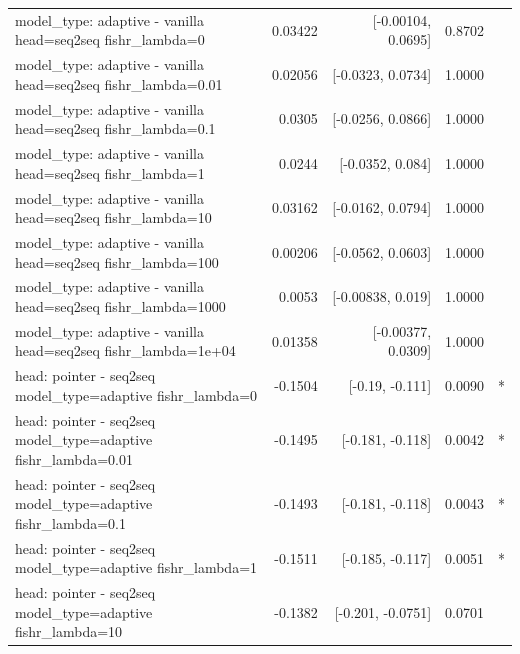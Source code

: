 \documentclass[10pt]{article}
\makeatletter
\newcommand{\stackcell}[1]{\begin{tabular}[t]{@{}l@{}}#1\end{tabular}}
\makeatother
\begin{document}
{\begin{longtable}{lrrrl}
\stackcell{model\_type: adaptive - vanilla\\\footnotesize head=seq2seq fishr\_lambda=0 } & 0.03422 & [-0.00104, 0.0695] & 0.8702 & \\
\stackcell{model\_type: adaptive - vanilla\\\footnotesize head=seq2seq fishr\_lambda=0.01 } & 0.02056 & [-0.0323, 0.0734] & 1.0000 & \\
\stackcell{model\_type: adaptive - vanilla\\\footnotesize head=seq2seq fishr\_lambda=0.1 } & 0.0305 & [-0.0256, 0.0866] & 1.0000 & \\
\stackcell{model\_type: adaptive - vanilla\\\footnotesize head=seq2seq fishr\_lambda=1 } & 0.0244 & [-0.0352, 0.084] & 1.0000 & \\
\stackcell{model\_type: adaptive - vanilla\\\footnotesize head=seq2seq fishr\_lambda=10 } & 0.03162 & [-0.0162, 0.0794] & 1.0000 & \\
\stackcell{model\_type: adaptive - vanilla\\\footnotesize head=seq2seq fishr\_lambda=100 } & 0.00206 & [-0.0562, 0.0603] & 1.0000 & \\
\stackcell{model\_type: adaptive - vanilla\\\footnotesize head=seq2seq fishr\_lambda=1000 } & 0.0053 & [-0.00838, 0.019] & 1.0000 & \\
\stackcell{model\_type: adaptive - vanilla\\\footnotesize head=seq2seq fishr\_lambda=1e+04 } & 0.01358 & [-0.00377, 0.0309] & 1.0000 & \\
\stackcell{head: pointer - seq2seq\\\footnotesize model\_type=adaptive fishr\_lambda=0 } & -0.1504 & [-0.19, -0.111] & 0.0090 & *\\
\stackcell{head: pointer - seq2seq\\\footnotesize model\_type=adaptive fishr\_lambda=0.01 } & -0.1495 & [-0.181, -0.118] & 0.0042 & *\\
\stackcell{head: pointer - seq2seq\\\footnotesize model\_type=adaptive fishr\_lambda=0.1 } & -0.1493 & [-0.181, -0.118] & 0.0043 & *\\
\stackcell{head: pointer - seq2seq\\\footnotesize model\_type=adaptive fishr\_lambda=1 } & -0.1511 & [-0.185, -0.117] & 0.0051 & *\\
\stackcell{head: pointer - seq2seq\\\footnotesize model\_type=adaptive fishr\_lambda=10 } & -0.1382 & [-0.201, -0.0751] & 0.0701 & \\

\end{longtable}}
\end{document}
